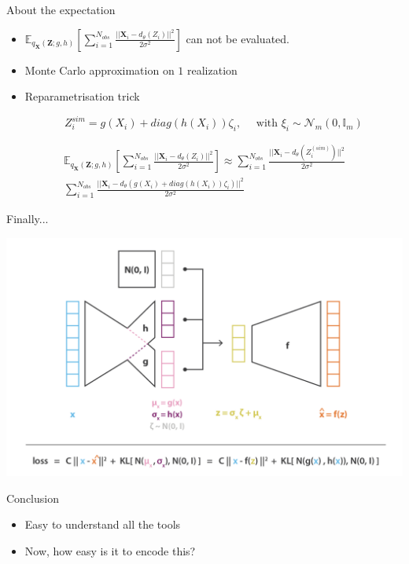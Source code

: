 \documentclass[compress,10pt]{beamer}
\begin{document}
\begin{frame}{About the expectation}
\begin{itemize}
 \item \(\mathbb{E}_{q_{\mathbf{X}}(\mathbf{Z};g,h)} \left[\sum_{i=1}^{N_{obs}}  \frac{||\mathbf{X}_i - d_{\theta}(Z_i)||^2}{2\sigma^2}\right]\)
can not be evaluated.


\item Monte Carlo approximation on $1$ realization
\item Reparametrisation trick 

$$Z_i^{sim} = g(X_i) + diag(h(X_i))\zeta_i, \quad \mbox{ with } \xi_i\sim \mathcal{N}_m(0,\mathbb{I}_m)$$
\end{itemize}


\begin{eqnarray*}
 \mathbb{E}_{q_{\mathbf{X}}(\mathbf{Z};g,h)}  \left[\sum_{i=1}^{N_{obs}}   \frac{||\mathbf{X}_i - d_{\theta}(Z_i)||^2}{2\sigma^2}\right] \approx  \sum_{i=1}^{N_{obs}} \frac{||\mathbf{X}_i - d_{\theta}(Z^{(sim)}_i)||^2}{2\sigma^2}\\
  \sum_{i=1}^{N_{obs}} \frac{||\mathbf{X}_i - d_{\theta}(g(X_i) + diag(h(X_i))\zeta_i)||^2}{2\sigma^2}
\end{eqnarray*}



\end{frame}
\begin{frame}{Finally...}
\begin{center}\includegraphics[width=0.8\linewidth]{images/varAutoencoderAll} \end{center}
 
\end{frame}



\begin{frame}{Conclusion}

\begin{itemize}
 \item Easy to understand all the tools
 \item Now, how easy is it to encode this? 
\end{itemize}


\end{frame}
\end{document}
